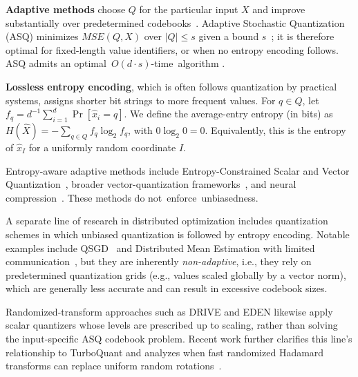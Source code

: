 \documentclass[11pt,letterpaper]{article}
\begin{document}
\textbf{Adaptive methods} choose $Q$ for the particular input $X$ and improve substantially over predetermined codebooks~\cite{zhang2017zipml, faghri2020adaptive, ben2024optimal}. Adaptive Stochastic Quantization (ASQ) minimizes $MSE(Q,X)$ over $|Q|\le s$ given a bound $s$~\cite{zhang2017zipml}; it is therefore optimal for fixed-length value identifiers, or when no entropy encoding follows. ASQ admits an \mbox{optimal $O(d\cdot s)$-time algorithm} \cite{ben2024optimal}.

\textbf{Lossless entropy encoding}, which is often follows quantization by practical systems, assigns shorter bit strings to more frequent values. For $q\in Q$, let $f_q=d^{-1}\sum_{i=1}^d\Pr[\widehat x_i=q]$. We define the average-entry entropy (in bits) as
$H(\widehat X)=-\sum_{q\in Q}f_q\log_2f_q$, with $0\log_2 0=0$. Equivalently, this is the entropy of $\widehat x_I$ for a uniformly random coordinate $I$.

Entropy-aware adaptive methods include Entropy-Constrained Scalar and Vector Quantization~\cite{gish1968asymptotically,chou1989entropy}, broader vector-quantization frameworks~\cite{gersho1992vector}, and neural compression~\cite{balle2017end}. These methods do \mbox{not enforce unbiasedness.}

A separate line of research in distributed optimization includes quantization schemes in which unbiased quantization is followed by entropy encoding. Notable examples include QSGD~\cite{NIPS2017_6c340f25} and Distributed Mean Estimation with limited communication~\cite{pmlr-v70-suresh17a}, but they are inherently \textit{non-adaptive}, i.e., they rely on predetermined quantization grids (e.g., values scaled globally by a vector norm), which are generally less accurate and can result in excessive codebook sizes.

\ifarxiv
Randomized-transform approaches such as DRIVE and EDEN likewise apply scalar
quantizers whose levels are prescribed up to scaling, rather than solving the
input-specific ASQ codebook problem. Recent work further clarifies this line's
relationship to TurboQuant and analyzes when fast randomized Hadamard
transforms can replace uniform random rotations~\cite{vargaftik2021drive,vargaftik2022eden,benbasat2026turboquant,benbasat2026hadamard}.
\fi
\end{document}
